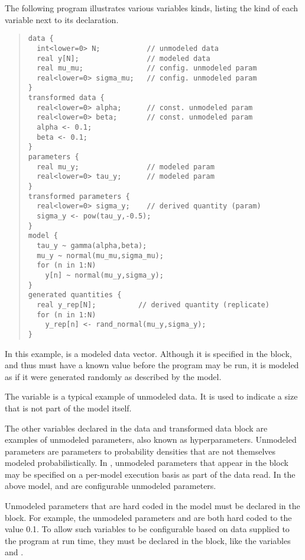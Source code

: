 The following program illustrates various variables kinds, listing the
kind of each variable next to its declaration.
%
\begin{quote}
\begin{Verbatim}
data {
  int<lower=0> N;           // unmodeled data
  real y[N];                // modeled data
  real mu_mu;               // config. unmodeled param
  real<lower=0> sigma_mu;   // config. unmodeled param
}
transformed data {
  real<lower=0> alpha;      // const. unmodeled param
  real<lower=0> beta;       // const. unmodeled param
  alpha <- 0.1;       
  beta <- 0.1;
} 
parameters {
  real mu_y;                // modeled param
  real<lower=0> tau_y;      // modeled param
} 
transformed parameters {
  real<lower=0> sigma_y;    // derived quantity (param)
  sigma_y <- pow(tau_y,-0.5);
}
model {
  tau_y ~ gamma(alpha,beta);
  mu_y ~ normal(mu_mu,sigma_mu);
  for (n in 1:N)
    y[n] ~ normal(mu_y,sigma_y);
}
generated quantities {
  real y_rep[N];          // derived quantity (replicate)
  for (n in 1:N)
    y_rep[n] <- rand_normal(mu_y,sigma_y);
}
\end{Verbatim}
\end{quote}
%
In this example,  is a modeled data vector.  Although it is
specified in the  block, and thus must have a known value
before the program may be run, it is modeled as if it were generated
randomly as described by the model.  

The variable  is a typical example of unmodeled data.  It is
used to indicate a size that is not part of the model itself.

The other variables declared in the data and transformed data block are
examples of unmodeled parameters, also known as hyperparameters.
Unmodeled parameters are parameters to probability densities that are
not themselves modeled probabilistically.  In \Stan, unmodeled
parameters that appear in the  block may be specified on a
per-model execution basis as part of the data read.  In the above
model,  and  are configurable unmodeled
parameters.  

Unmodeled parameters that are hard coded in the model must be declared
in the  block.  For example, the unmodeled
parameters  and  are both hard coded to the
value 0.1.  To allow such variables to be configurable based on data
supplied to the program at run time, they must be declared in the
 block, like the variables  and
.


